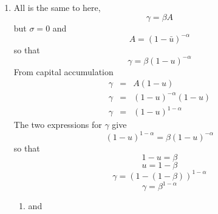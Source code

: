 \documentclass{article}
\begin{document}
\begin{enumerate}
\item All is the same to here, 
\begin{equation*}
\gamma =\beta A
\end{equation*}%
but $\sigma =0$ and 
\begin{equation*}
A=\left( 1-\bar{u}\right) ^{-\alpha }
\end{equation*}%
so that 
\begin{equation*}
\gamma =\beta \left( 1-u\right) ^{-\alpha }
\end{equation*}%
From capital accumulation%
\begin{eqnarray*}
\gamma &=&A(1-u)\  \\
\gamma &=&\left( 1-u\right) ^{-\alpha }(1-u) \\
\gamma &=&\left( 1-u\right) ^{1-\alpha }
\end{eqnarray*}%
The two expressions for $\gamma $ give%
\begin{equation*}
\left( 1-u\right) ^{1-\alpha }=\beta \left( 1-u\right) ^{-\alpha }
\end{equation*}%
so that%
\begin{equation*}
1-u=\beta
\end{equation*}%
\begin{equation*}
u=1-\beta
\end{equation*}%
\begin{equation*}
\gamma =\left( 1-\left( 1-\beta \right) \right) ^{1-\alpha }
\end{equation*}%
\begin{equation*}
\gamma =\beta ^{1-\alpha }
\end{equation*}

\begin{enumerate}
\item and
\end{enumerate}


\end{enumerate}
\end{document}
